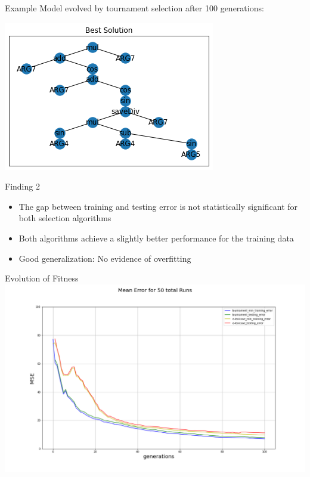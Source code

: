 \documentclass[
  ignorenonframetext,
]{beamer}
\providecommand{\tightlist}{%
  \setlength{\itemsep}{0pt}\setlength{\parskip}{0pt}}
\begin{document}
\begin{frame}{Example}
\protect\hypertarget{example}{}
Model evolved by tournament selection after 100 generations:

\includegraphics{../plots/example_model.png}
\end{frame}

\begin{frame}{Finding 2}
\protect\hypertarget{finding-2}{}
\begin{itemize}
\tightlist
\item
  The gap between training and testing error is not statistically
  significant for both selection algorithms
\item
  Both algorithms achieve a slightly better performance for the training
  data
\item
  Good generalization: No evidence of overfitting
\end{itemize}
\end{frame}

\begin{frame}{Evolution of Fitness}
\protect\hypertarget{evolution-of-fitness}{}
\includegraphics{../plots/mean_error_combined.png}
\end{frame}
\end{document}
